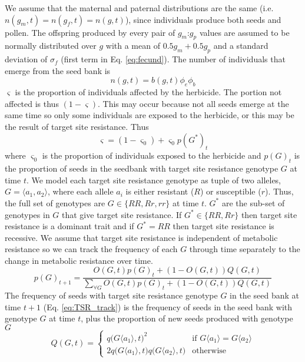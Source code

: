 \documentclass[12pt, a4paper]{article}
\begin{document}
We assume that the maternal and paternal distributions are the same (i.e. $n(g_m, t) = n(g_f, t) = n(g, t)$), since individuals produce both seeds and pollen. The offspring produced by every pair of $g_m$:$g_p$ values are assumed to be normally distributed over $g$ with a mean of $0.5g_m + 0.5g_p$ and a standard deviation of $\sigma_f$ (first term in Eq. \ref{eq:fecund}). The number of individuals that emerge from the seed bank is
\begin{equation}\label{eq:above_ground}
	n(g, t) = b(g, t)\phi_e\phi_b
\end{equation}
$\varsigma$ is the proportion of individuals affected by the herbicide. The portion not affected is thus $(1 - \varsigma)$. This may occur because not all seeds emerge at the same time so only some individuals are exposed to the herbicide, or this may be the result of target site resistance. Thus
\begin{equation}\label{eq:pro_exp}
	\varsigma = (1 - \varsigma_0) + \varsigma_0 p(G^*)_t
\end{equation}
where $\varsigma_0$ is the proportion of individuals exposed to the herbicide and $p(G)_t$ is the proportion of seeds in the seedbank with target site resistance genotype $G$ at time $t$. We model each target site resistance genotype as tuple of two alleles, $G = \langle a_1, a_2\rangle$, where each allele $a_i$ is either resistant ($R$) or susceptible ($r$). Thus, the full set of genotypes are $G \in \{RR, Rr, rr\}$ at time $t$. $G^*$ are the sub-set of genotypes in $G$ that give target site resistance. If $G^* \in \{RR, Rr\}$ then target site resistance is a dominant trait and if $G^* = RR$ then target site resistance is recessive.  We assume that target site resistance is independent of metabolic resistance so we can track the frequency of each $G$ through time separately to the change in metabolic resistance over time. 
\begin{equation}\label{eq:TSR_track}
	p(G)_{t+1} = \frac{O(G, t)p(G)_t + (1 - O(G, t))Q(G, t)}{\sum_{\forall G} O(G, t)p(G)_t + (1 - O(G, t))Q(G, t)}
\end{equation}      
The frequency of seeds with target site resistance genotype $G$ in the seed bank at time $t + 1$ (Eq. \ref{eq:TSR_track}) is the frequency of seeds in the seed bank with genotype $G$ at time $t$, plus the proportion of new seeds produced with genotype $G$  
\begin{equation}\label{eq:G_freq}
	Q(G, t) = \begin{cases}
		q\big(G\langle a_1 \rangle, t \big)^2 &\text{if } G\langle a_1 \rangle = G\langle a_2 \rangle\\
		2q\big(G\langle a_1 \rangle, t \big)q\big(G\langle a_2 \rangle, t\big) &\text{otherwise}
	\end{cases}
\end{equation}
\end{document}
